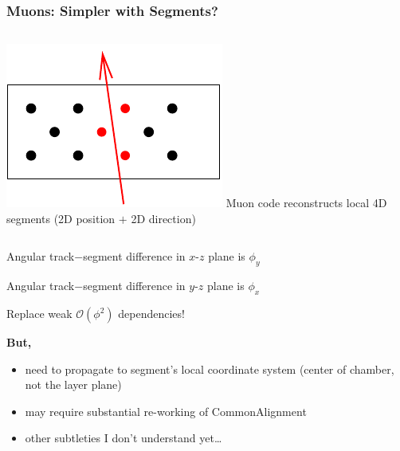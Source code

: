 \documentclass[12pt,compress]{beamer}
\begin{document}
\begin{frame}
\frametitle{Muons: Simpler with Segments?}

\begin{columns}
\includegraphics[width=\linewidth]{simpler_with_segments}
Muon code reconstructs local 4D segments (2D position $+$ 2D direction)
\end{columns}

\vfill
Angular track$-$segment difference in $x$-$z$ plane is $\phi_y$

Angular track$-$segment difference in $y$-$z$ plane is $\phi_x$

\vspace{0.2 cm}
Replace weak $\mathcal{O}(\phi^2)$ dependencies!

\vfill
{\bf But,}
\begin{itemize}
  \item need to propagate to segment's local coordinate system (center
  of chamber, not the layer plane)
  \item may require substantial re-working of CommonAlignment
  \item other subtleties I don't understand yet\ldots
\end{itemize}
\end{frame}
\end{document}

